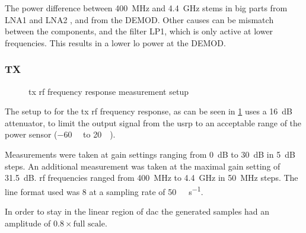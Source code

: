 \documentclass[12pt,a4paper,parskip=full,abstracton]{scrartcl}
\begin{document}
The power difference between \SI{400}{\mega\hertz} and \SI{4.4}{\giga\hertz}
stems in big parts from LNA1 and LNA2 \cite{rxlna}, and from the DEMOD. Other
causes can be mismatch between the components, and the filter LP1, which is only
active at lower frequencies. This results in a lower \gls{lo} power at the DEMOD.

\subsubsection{TX}
\label{sec:rftx}
\begin{figure}[htb]
    \centering
    \caption{\gls{tx} \gls{rf} frequency response measurement setup}
    \label{fig:txrfsetup}
\end{figure}

The setup to for the \gls{tx} \gls{rf} frequency response, as can be seen in 
\cref{fig:txrfsetup} uses a \SI{16}{\deci\bel} attenuator, to limit the output
signal from the \gls{usrp} to an acceptable range of the power sensor (\SI{-60}{\deci\belm}
to \SI{20}{\deci\belm}).

Measurements were taken at gain settings ranging from \SI{0}{\deci\bel} to \SI{30}{\deci\bel}
in \SI{5}{\deci\bel} steps. An additional measurement was taken at the maximal gain
setting of \SI{31.5}{\deci\bel}. \gls{rf} frequencies ranged from \SI{400}{\mega\hertz} to
\SI{4.4}{\giga\hertz} in \SI{50}{\mega\hertz} steps. The line format used was
\SI{8}{\bit} at a sampling rate of \SI{50}{\mega\samples\per\second}.

In order to stay in the linear region of \gls{dac} the generated samples had an amplitude
of $0.8 \times \text{full scale}$.
\end{document}
